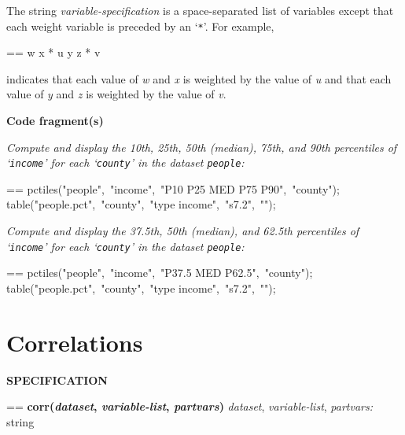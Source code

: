 \documentclass{book}
\makeatletter
\newcommand\Texinfocommandstyletextvar[1]{{\normalfont{}\textsl{#1}}}%
\newenvironment{Texinfopreformatted}{%
  \par\GNUTobeylines\obeyspaces\frenchspacing\parskip=\z@\parindent=\z@}{}
{\catcode`\^^M=13 \gdef\GNUTobeylines{\catcode`\^^M=13 \def^^M{\null\par}}}
\newenvironment{Texinfoindented}{\begin{list}{}{}\item\relax}{\end{list}}
\renewcommand{\_}{\Texinfounderscore\discretionary{}{}{}}
\makeatother
\begin{document}
The string \Texinfocommandstyletextvar{variable-specification}
is a space-separated list of variables except that each weight
%
variable is preceded by an `\texttt{*}'.
For example,

\begin{Texinfoindented}
\begin{Texinfopreformatted}%
\ttfamily w x * u y z * v
\end{Texinfopreformatted}
\end{Texinfoindented}

\noindent{}indicates that each value of \Texinfocommandstyletextvar{w} and \Texinfocommandstyletextvar{x}
is weighted by the value of \Texinfocommandstyletextvar{u} and that each value of
\Texinfocommandstyletextvar{y} and \Texinfocommandstyletextvar{z} is weighted by the value of
\Texinfocommandstyletextvar{v}.

\noindent{}\textbf{Code fragment(s)}

\emph{Compute and display the 10th, 25th, 50th (median), 75th, and 90th percentiles
of `\texttt{income}' for each `\texttt{county}' in the dataset \texttt{people}:}
\begin{Texinfoindented}
\begin{Texinfopreformatted}%
\ttfamily pctiles("people",\ "income",\ "P10 P25 MED P75 P90",\ "county");
table("people.pct",\ "county",\ "\_type\_ income",\ "s7.2",\ "");
\end{Texinfopreformatted}
\end{Texinfoindented}

\emph{Compute and display the 37.5th, 50th (median), and 62.5th percentiles
of `\texttt{income}' for each `\texttt{county}' in the dataset \texttt{people}:}
\begin{Texinfoindented}
\begin{Texinfopreformatted}%
\ttfamily pctiles("people",\ "income",\ "P37.5 MED P62.5",\ "county");
table("people.pct",\ "county",\ "\_type\_ income",\ "s7.2",\ "");
\end{Texinfopreformatted}
\end{Texinfoindented}
%
%

\section{{Correlations}}
\label{anchor:Correlations}%

\noindent{}\textbf{SPECIFICATION}
\begin{Texinfoindented}
\begin{Texinfopreformatted}%
\textbf{corr(\Texinfocommandstyletextvar{dataset}, \Texinfocommandstyletextvar{variable-list}, \Texinfocommandstyletextvar{partvars})}
\Texinfocommandstyletextvar{dataset}, \Texinfocommandstyletextvar{variable-list}, \Texinfocommandstyletextvar{partvars:} string
\end{Texinfopreformatted}
\end{Texinfoindented}
\end{document}
